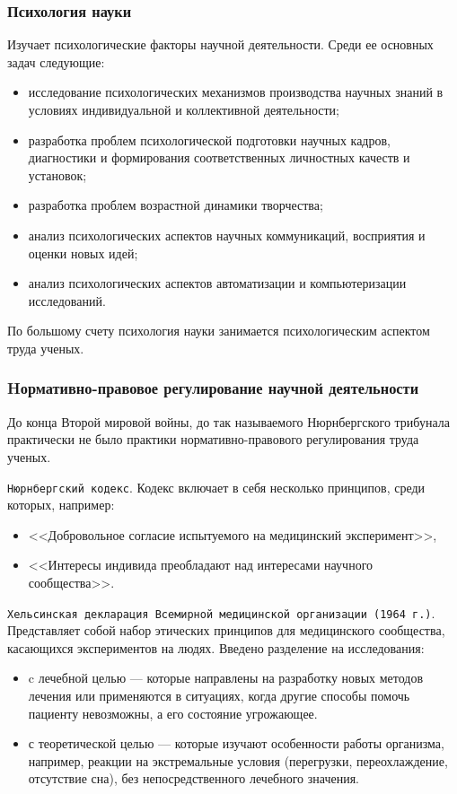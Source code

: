 \subsubsection{Психология науки}
Изучает психологические факторы научной деятельности. Среди ее основных задач следующие: 
\begin{itemize}
    \item исследование психологических механизмов производства научных знаний в условиях индивидуальной и коллективной деятельности;
    \item разработка проблем психологической подготовки научных кадров, диагностики и формирования соответственных личностных качеств и установок;
    \item разработка проблем возрастной динамики творчества;
    \item анализ психологических аспектов научных коммуникаций, восприятия и оценки новых идей;
    \item анализ психологических аспектов автоматизации и компьютеризации исследований.
\end{itemize}
По большому счету психология науки занимается психологическим аспектом труда ученых. 

\subsubsection{Hормативно-правовое регулирование научной деятельности}

До конца Второй мировой войны, до так называемого Нюрнбергского трибунала практически не было практики нормативно-правового регулирования труда ученых. 

\texttt{Нюрнбергский кодекс}. Кодекс включает в себя несколько принципов,  среди которых, например:
\begin{itemize}
    \item <<Добровольное согласие испытуемого на медицинский эксперимент>>,
    \item <<Интересы индивида преобладают над интересами научного сообщества>>.
\end{itemize}

\texttt{Хельсинская декларация Всемирной медицинской организации (1964 г.)}. 
Представляет собой набор этических принципов для медицинского сообщества, касающихся экспериментов на людях. Введено разделение на исследования:
\begin{itemize}
    \item c лечебной целью --- которые направлены на разработку новых методов лечения или применяются в ситуациях, когда другие способы помочь пациенту невозможны, а его состояние угрожающее.
    \item с теоретической целью --- которые изучают особенности работы организма, например, реакции на экстремальные условия (перегрузки, переохлаждение, отсутствие сна), без непосредственного лечебного значения.
\end{itemize}


